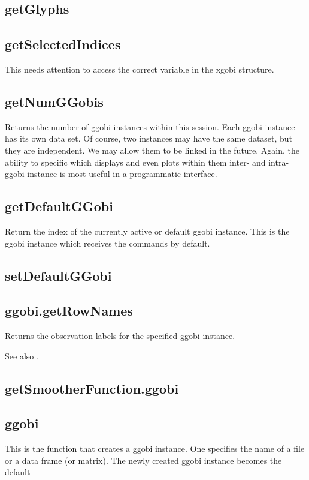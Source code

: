 \documentclass{article}
\begin{document}
\subsection{getGlyphs}


\subsection{getSelectedIndices}
This needs attention to access the correct
variable in the xgobi structure.


\subsection{getNumGGobis}
Returns the number of ggobi instances within this session.  Each ggobi
instance has its own data set. Of course, two instances may have the
same dataset, but they are independent.  We may allow them to be
linked in the future.  Again, the ability to specific which displays
and even plots within them inter- and intra- ggobi instance is most
useful in a programmatic interface.

\subsection{getDefaultGGobi}
Return the index of the currently active or default ggobi instance.
This is the ggobi instance which receives the commands by default.


\subsection{setDefaultGGobi}

\subsection{ggobi.getRowNames}
Returns the observation labels for
the specified ggobi instance.

See also .

\subsection{getSmootherFunction.ggobi}
\subsection{ggobi}
This is the function that creates a ggobi instance.
One specifies the name of a file or a data frame (or matrix).
The newly created ggobi instance becomes the default
\end{document}
